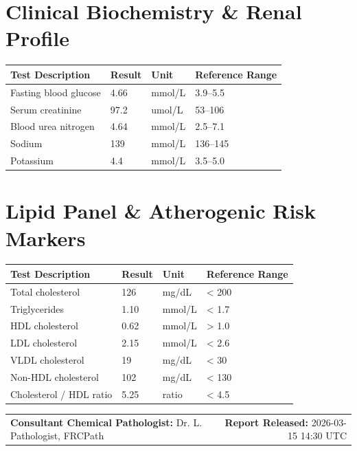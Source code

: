 \documentclass[10pt,a4paper]{article}
\begin{document}
\vspace{8pt}

\section*{Clinical Biochemistry \& Renal Profile}

\begin{tabular}{@{} p{6.4cm} p{2.5cm} p{2.5cm} p{3.1cm} @{}}
  \toprule
  \textbf{Test Description} & \textbf{Result} & \textbf{Unit} & \textbf{Reference Range} \\
  \midrule
  Fasting blood glucose & 4.66 & mmol/L & 3.9--5.5 \\
  Serum creatinine & 97.2 & umol/L & 53--106 \\
  Blood urea nitrogen & 4.64 & mmol/L & 2.5--7.1 \\
  Sodium & 139 & mmol/L & 136--145 \\
  Potassium & 4.4 & mmol/L & 3.5--5.0 \\
  \bottomrule
\end{tabular}

\vspace{8pt}

\section*{Lipid Panel \& Atherogenic Risk Markers}

\begin{tabular}{@{} p{6.4cm} p{2.5cm} p{2.5cm} p{3.1cm} @{}}
  \toprule
  \textbf{Test Description} & \textbf{Result} & \textbf{Unit} & \textbf{Reference Range} \\
  \midrule
  Total cholesterol & 126 & mg/dL & < 200 \\
  Triglycerides & 1.10 & mmol/L & < 1.7 \\
  HDL cholesterol & 0.62 & mmol/L & > 1.0 \\
  LDL cholesterol & 2.15 & mmol/L & < 2.6 \\
  VLDL cholesterol & 19 & mg/dL & < 30 \\
  Non-HDL cholesterol & 102 & mg/dL & < 130 \\
  Cholesterol / HDL ratio & 5.25 & ratio & < 4.5 \\
  \bottomrule
\end{tabular}

\vspace{14pt}

\noindent
\begin{tabular*}{\textwidth}{@{} l @{\extracolsep{\fill}} r @{}}
  \textbf{Consultant Chemical Pathologist:} Dr. L. Pathologist, FRCPath & \textbf{Report Released:} 2026-03-15 14:30 UTC \\
\end{tabular*}
\end{document}
